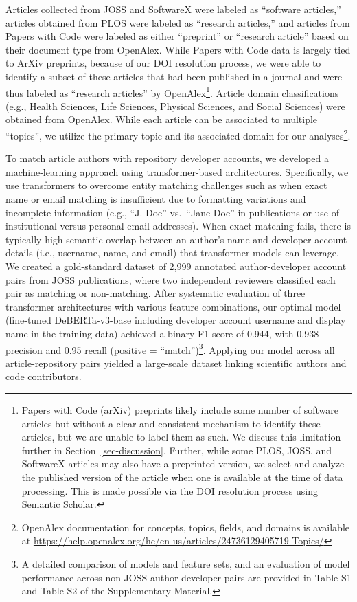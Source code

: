 \documentclass[
  number,
  3p,
  onecolumn]{elsarticle}
\begin{document}
Articles collected from JOSS and SoftwareX were labeled as ``software
articles,'' articles obtained from PLOS were labeled as ``research
articles,'' and articles from Papers with Code were labeled as either
``preprint'' or ``research article'' based on their document type from
OpenAlex. While Papers with Code data is largely tied to ArXiv
preprints, because of our DOI resolution process, we were able to
identify a subset of these articles that had been published in a journal
and were thus labeled as ``research articles'' by OpenAlex\footnote{Papers
  with Code (arXiv) preprints likely include some number of software
  articles but without a clear and consistent mechanism to identify
  these articles, but we are unable to label them as such. We discuss
  this limitation further in Section~\ref{sec-discussion}. Further,
  while some PLOS, JOSS, and SoftwareX articles may also have a
  preprinted version, we select and analyze the published version of the
  article when one is available at the time of data processing. This is
  made possible via the DOI resolution process using Semantic Scholar.}.
Article domain classifications (e.g., Health Sciences, Life Sciences,
Physical Sciences, and Social Sciences) were obtained from OpenAlex.
While each article can be associated to multiple ``topics'', we utilize
the primary topic and its associated domain for our analyses\footnote{OpenAlex
  documentation for concepts, topics, fields, and domains is available
  at
  \url{https://help.openalex.org/hc/en-us/articles/24736129405719-Topics/}}.

To match article authors with repository developer accounts, we
developed a machine-learning approach using transformer-based
architectures. Specifically, we use transformers to overcome entity
matching challenges such as when exact name or email matching is
insufficient due to formatting variations and incomplete information
(e.g., ``J. Doe'' vs.~``Jane Doe'' in publications or use of
institutional versus personal email addresses). When exact matching
fails, there is typically high semantic overlap between an author's name
and developer account details (i.e., username, name, and email) that
transformer models can leverage. We created a gold-standard dataset of
2,999 annotated author-developer account pairs from JOSS publications,
where two independent reviewers classified each pair as matching or
non-matching. After systematic evaluation of three transformer
architectures with various feature combinations, our optimal model
(fine-tuned DeBERTa-v3-base including developer account username and
display name in the training data) achieved a binary F1 score of 0.944,
with 0.938 precision and 0.95 recall (positive = ``match'')\footnote{A
  detailed comparison of models and feature sets, and an evaluation of
  model performance across non-JOSS author-developer pairs are provided
  in Table S1 and Table S2 of the Supplementary Material.}. Applying our
model across all article-repository pairs yielded a large-scale dataset
linking scientific authors and code contributors.
\end{document}
